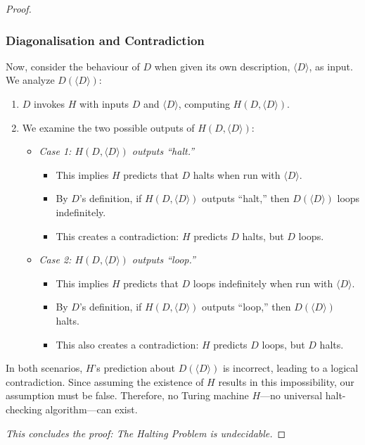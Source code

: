 \begin{proof}
\subsubsection*{Diagonalisation and Contradiction}
Now, consider the behaviour of $D$ when given its own description, $\langle D \rangle$, as input. We analyze $D(\langle D \rangle)$:
\begin{enumerate}
    \item $D$ invokes $H$ with inputs $D$ and $\langle D \rangle$, computing $H(D, \langle D \rangle)$.
    \item We examine the two possible outputs of $H(D, \langle D \rangle)$:
        \begin{itemize}
            \item \textit{Case 1: $H(D, \langle D \rangle)$ outputs ``halt.''}
                \begin{itemize}
                    \item This implies $H$ predicts that $D$ halts when run with $\langle D \rangle$.
                    \item By $D$'s definition, if $H(D, \langle D \rangle)$ outputs ``halt,'' then $D(\langle D \rangle)$ loops indefinitely.
                    \item This creates a contradiction: $H$ predicts $D$ halts, but $D$ loops.
                \end{itemize}
            \item \textit{Case 2: $H(D, \langle D \rangle)$ outputs ``loop.''}
                \begin{itemize}
                    \item This implies $H$ predicts that $D$ loops indefinitely when run with $\langle D \rangle$.
                    \item By $D$'s definition, if $H(D, \langle D \rangle)$ outputs ``loop,'' then $D(\langle D \rangle)$ halts.
                    \item This also creates a contradiction: $H$ predicts $D$ loops, but $D$ halts.
                \end{itemize}
        \end{itemize}
\end{enumerate}
In both scenarios, $H$'s prediction about $D(\langle D \rangle)$ is incorrect, leading to a logical contradiction. Since assuming the existence of $H$ results in this impossibility, our assumption must be false. Therefore, no Turing machine $H$---no universal halt-checking algorithm---can exist.

\textit{This concludes the proof: The Halting Problem is undecidable.}
\end{proof}


